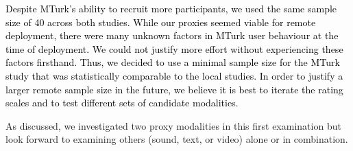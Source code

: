     \textcolor{black}{Despite MTurk's ability to recruit more participants, we used the same sample size of 40 across both studies. While our proxies seemed viable for remote deployment, there were many unknown factors in MTurk user behaviour at the time of deployment. We could not justify more effort without experiencing these factors firsthand. Thus, we decided to use a minimal sample size for the MTurk study that was statistically comparable to the local studies. In order to justify a larger remote sample size in the future, we believe it is best to iterate the rating scales and to test different sets of candidate modalities.}
    
    As discussed, we investigated two proxy modalities in this first examination but look forward to examining others (sound, text, or video) alone or in combination.
        

      
